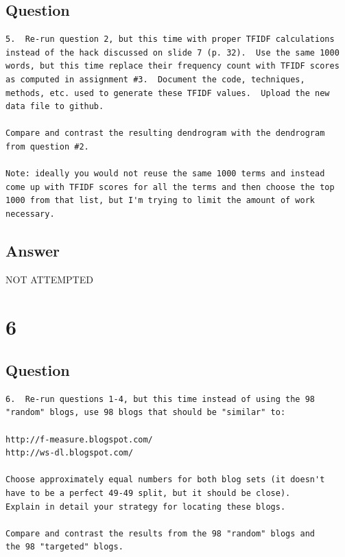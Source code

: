 \documentclass[letterpaper,11pt]{article}
\begin{document}
\subsection*{Question}

\begin{verbatim}
5.  Re-run question 2, but this time with proper TFIDF calculations
instead of the hack discussed on slide 7 (p. 32).  Use the same 1000
words, but this time replace their frequency count with TFIDF scores
as computed in assignment #3.  Document the code, techniques,
methods, etc. used to generate these TFIDF values.  Upload the new
data file to github.

Compare and contrast the resulting dendrogram with the dendrogram
from question #2.

Note: ideally you would not reuse the same 1000 terms and instead
come up with TFIDF scores for all the terms and then choose the top
1000 from that list, but I'm trying to limit the amount of work
necessary.
\end{verbatim}

\subsection*{Answer}

\begin{center}
\Huge{NOT ATTEMPTED}
\end{center}


\clearpage


\section*{6}

\subsection*{Question}

\begin{verbatim}
6.  Re-run questions 1-4, but this time instead of using the 98 
"random" blogs, use 98 blogs that should be "similar" to:

http://f-measure.blogspot.com/
http://ws-dl.blogspot.com/

Choose approximately equal numbers for both blog sets (it doesn't
have to be a perfect 49-49 split, but it should be close).  
Explain in detail your strategy for locating these blogs.  

Compare and contrast the results from the 98 "random" blogs and 
the 98 "targeted" blogs. 
\end{verbatim}
\end{document}
